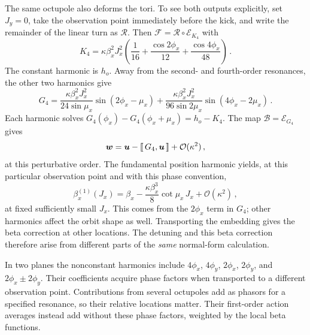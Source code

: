 The same octupole also deforms the tori.  To see both outputs explicitly,
set $J_y = 0$, take the observation point immediately before the kick, and
write the remainder of the linear turn as $\mathcal R$.  Then
$\mathcal F = \mathcal R\circ\mathcal E_{K_4}$ with
\begin{equation}\label{eq:nnf-octupole-harmonics}
    K_4 = \kappa\beta_x^2J_x^2
    \left(\frac{1}{16} + \frac{\cos2\phi_x}{12} + \frac{\cos4\phi_x}{48}\right)\,.
\end{equation}
The constant harmonic is $h_o$.  Away from the second- and fourth-order
resonances, the other two harmonics give
\begin{equation}\label{eq:nnf-octupole-normaliser}
    G_4 = \frac{\kappa\beta_x^2J_x^2}{24\sin\mu_x}
    \sin(2\phi_x-\mu_x) + \frac{\kappa\beta_x^2J_x^2}{96\sin2\mu_x}
    \sin(4\phi_x-2\mu_x)\,.
\end{equation}
Each harmonic solves
$G_4(\phi_x)-G_4(\phi_x + \mu_x) = h_o-K_4$.
The map $\mathcal B = \mathcal E_{G_4}$ gives
\begin{equation}
    \bm{w} = \bm{u}-\llbracket \, G_4,\bm{u}\,\rrbracket + \mathcal O(\kappa^2)\,,
\end{equation}
at this perturbative order.  The fundamental position harmonic yields,
at this particular observation point and with this phase convention,
\begin{equation}\label{eq:nnf-octupole-beta}
    \beta_x^{(1)}(J_x) = \beta_x-\frac{\kappa\beta_x^3}{8}\cot\mu_x\,J_x + \mathcal O(\kappa^2)\,,
\end{equation}
at fixed sufficiently small $J_x$.  This comes from the $2\phi_x$ term
in $G_4$; other harmonics affect the orbit shape as well.  Transporting the
embedding gives the beta correction at other locations.  The detuning
and this beta correction therefore arise from different parts of the
\emph{same} normal-form calculation.

In two planes the nonconstant harmonics include $4\phi_x$,
$4\phi_y$, $2\phi_x$, $2\phi_y$, and
$2\phi_x\mathbin{\pm}2\phi_y$.  Their coefficients acquire phase
factors when transported to a different observation point.  Contributions
from several octupoles add as phasors for a specified resonance, so their
relative locations matter.  Their first-order action averages instead add
without these phase factors, weighted by the local beta functions.


